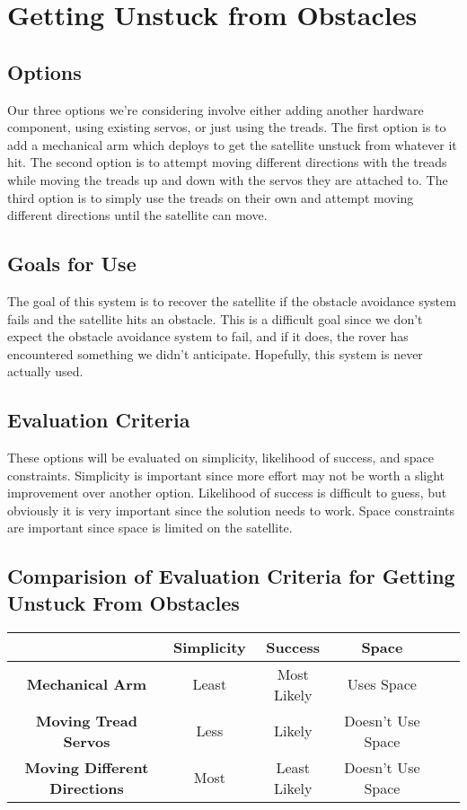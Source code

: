 \documentclass[10pt,letterpaper,onecolumn,journal]{IEEEtran}
\begin{document}
\section{Getting Unstuck from Obstacles}

\subsection{Options}
Our three options we’re considering involve either adding another hardware component, using existing servos, or just using the treads. The first option is to add a mechanical arm which deploys to get the satellite unstuck from whatever it hit. The second option is to attempt moving different directions with the treads while moving the treads up and down with the servos they are attached to. The third option is to simply use the treads on their own and attempt moving different directions until the satellite can move. 

\subsection{Goals for Use}
The goal of this system is to recover the satellite if the obstacle avoidance system fails and the satellite hits an obstacle. This is a difficult goal since we don’t expect the obstacle avoidance system to fail, and if it does, the rover has encountered something we didn’t anticipate. Hopefully, this system is never actually used. 

\subsection{Evaluation Criteria}
These options will be evaluated on simplicity, likelihood of success, and space constraints. Simplicity is important since more effort may not be worth a slight improvement over another option. Likelihood of success is difficult to guess, but obviously it is very important since the solution needs to work. Space constraints are important since space is limited on the satellite.
\subsection*{Comparision of Evaluation Criteria for Getting Unstuck From Obstacles}
\begin{center}
  \begin{tabular}{cccccc}
    \hline
    \multicolumn{1}{l}{} & \textbf{Simplicity} & \textbf{Success}      & \textbf{Space} \\
    \hline
    \textbf{Mechanical Arm}               & Least      & Most Likely  & Uses Space  \\
    \hline
    \textbf{Moving Tread Servos}          & Less       & Likely       & Doesn't Use Space \\
    \hline
    \textbf{Moving Different Directions}  & Most       & Least Likely & Doesn't Use Space  \\
    \hline
  \end{tabular}
\end{center}
\vspace{.3cm}
\end{document}

